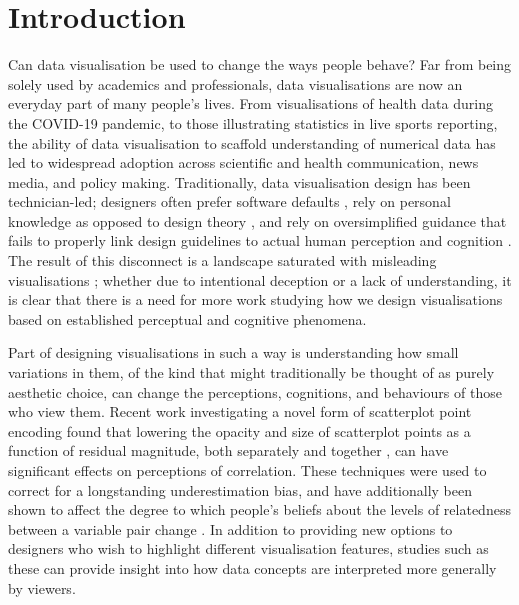 \documentclass[
  authoryear,
  preprint,
  3p]{elsarticle}
\begin{document}
\section{Introduction}\label{sec-intro}

Can data visualisation be used to change the ways people behave? Far
from being solely used by academics and professionals, data
visualisations are now an everyday part of many people's lives. From
visualisations of health data during the COVID-19 pandemic, to those
illustrating statistics in live sports reporting, the ability of data
visualisation to scaffold understanding of numerical data has led to
widespread adoption across scientific and health communication, news
media, and policy making. Traditionally, data visualisation design has
been technician-led; designers often prefer software defaults
\citep{haber_2016, petrescu_2024}, rely on personal knowledge as opposed
to design theory \citep{parsons_2020}, and rely on oversimplified
guidance that fails to properly link design guidelines to actual human
perception and cognition \citep{patterson_2014}. The result of this
disconnect is a landscape saturated with misleading visualisations
\citep{wtf_2026}; whether due to intentional deception
\citep{pandey_2015} or a lack of understanding, it is clear that there
is a need for more work studying how we design visualisations based on
established perceptual and cognitive phenomena.

Part of designing visualisations in such a way is understanding how
small variations in them, of the kind that might traditionally be
thought of as purely aesthetic choice, can change the perceptions,
cognitions, and behaviours of those who view them. Recent work
investigating a novel form of scatterplot point encoding found that
lowering the opacity and size of scatterplot points as a function of
residual magnitude, both separately \citep{strain_2023, strain_2023a}
and together \citep{strain_2024}, can have significant effects on
perceptions of correlation. These techniques were used to correct for a
longstanding underestimation bias, and have additionally been shown to
affect the degree to which people's beliefs about the levels of
relatedness between a variable pair change \citep{strain_2025}. In
addition to providing new options to designers who wish to highlight
different visualisation features, studies such as these can provide
insight into how data concepts are interpreted more generally by
viewers.
\end{document}
